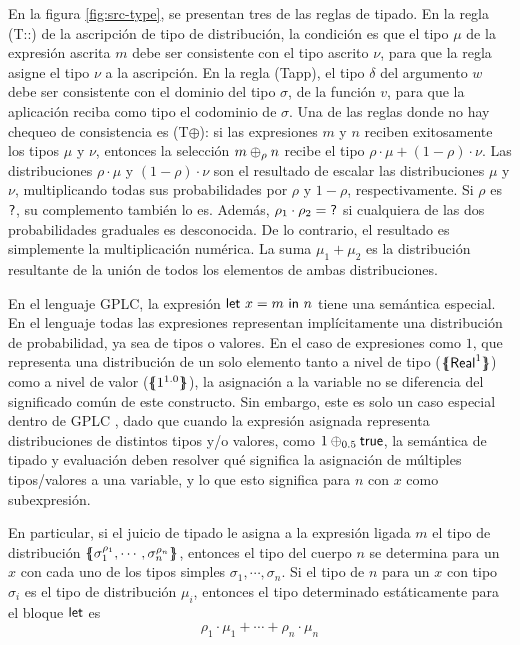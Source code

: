   En la figura \ref{fig:src-type}, se presentan tres de las reglas de tipado. En la regla (T::) de la ascripción de tipo de distribución, la condición es que el tipo $\mu$ de la expresión ascrita $m$ debe ser consistente con el tipo ascrito $\nu$, para que la regla asigne el tipo $\nu$ a la ascripción. En la regla (Tapp), el tipo $\delta$ del argumento $w$ debe ser consistente con el dominio del tipo $\sigma$, de la función $v$, para que la aplicación reciba como tipo el codominio de $\sigma$. Una de las reglas donde no hay chequeo de consistencia es (T$\oplus$): si las expresiones $m$ y $n$ reciben exitosamente los tipos $\mu$ y $\nu$, entonces la selección $\choiceterm{\rho}{m}{n}$ recibe el tipo $\rho \cdot \mu + (1-\rho) \cdot \nu$. Las distribuciones $\rho\cdot\mu$ y $(1-\rho) \cdot \nu$ son el resultado de escalar las distribuciones $\mu$ y $\nu$, multiplicando todas sus probabilidades por $\rho$ y $1-\rho$, respectivamente. Si $\rho$ es $\Any$, su complemento también lo es. Además, $\rho_1 \cdot \rho_2 = \Any$ si cualquiera de las dos probabilidades graduales es desconocida. De lo contrario, el resultado es simplemente la multiplicación numérica. La suma $\mu_1 + \mu_2$  es la distribución resultante de la unión de todos los elementos de ambas distribuciones.

  


  En el lenguaje GPLC, la expresión $\LetTerm{x}{m}{n}$ tiene una
  semántica especial.  En el lenguaje todas las expresiones
  representan implícitamente una distribución de probabilidad, ya sea
  de tipos o valores. En el caso de expresiones como $1$, que
  representa una distribución de un solo elemento tanto a nivel de
  tipo ($\distr{\Real^1}$) como a nivel de valor ($\distr{1^{1.0}}$),
  la asignación a la variable no se diferencia del significado común
  de este constructo. Sin embargo, este es solo un caso especial
  dentro de GPLC , dado que cuando la expresión asignada representa
  distribuciones de distintos tipos y/o valores, como
  $\ChoiceTerm{0.5}{1}{\true}$, la semántica de tipado y evaluación
  deben resolver qué significa la asignación de múltiples
  tipos/valores a una variable, y lo que esto significa para $n$ con
  $x$ como subexpresión.

  En particular, si el juicio de tipado le asigna a la expresión
  ligada $m$ el tipo de distribución $\distr{\sigma_1^{\rho_1},\cdots,\sigma_n^{\rho_n}}$, entonces el
  tipo del cuerpo $n$ se determina para un $x$ con cada uno de los
  tipos simples $\sigma_1, \cdots, \sigma_n$. Si el tipo de $n$ para
  un $x$ con tipo $\sigma_i$ es el tipo de distribución $\mu_i$,
  entonces el tipo determinado estáticamente para el bloque $\LetKW$
  es
\[ \rho_1\cdot\mu_1 + \cdots + \rho_n\cdot\mu_n\]





